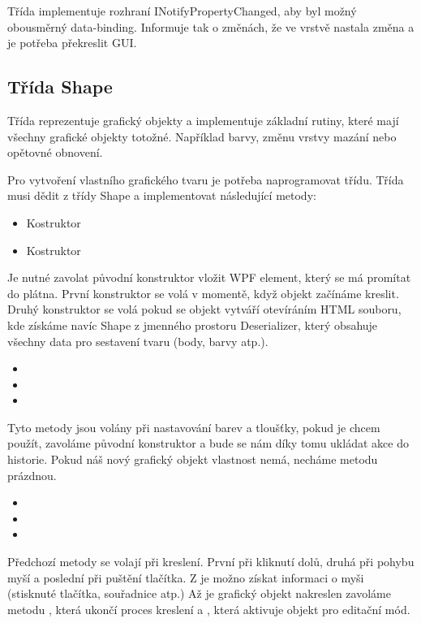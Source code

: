 \documentclass[
  field=inf,
  biblatex,
  glossaries,
  index
]{kidiplom}
\begin{document}
Třída implementuje rozhraní INotifyPropertyChanged, aby byl možný obousměrný data-binding. Informuje tak o změnách, že ve vrstvě nastala změna a je potřeba překreslit GUI.

\subsection{Třída Shape}

Třída reprezentuje grafický objekty a implementuje základní rutiny, které mají všechny grafické objekty totožné. Například barvy, změnu vrstvy mazání nebo opětovné obnovení.

Pro vytvoření vlastního grafického tvaru je potřeba naprogramovat třídu. Třída musi dědit z třídy Shape a implementovat následující metody:

\begin{itemize}
\item Kostruktor 
\item Kostruktor 
\end{itemize}
Je nutné zavolat původní konstruktor vložit WPF element, který se má promítat do plátna. První konstruktor se volá v momentě, když objekt začínáme kreslit. Druhý konstruktor se volá pokud se objekt vytváří otevíráním HTML souboru, kde získáme navíc Shape z jmenného prostoru Deserializer, který obsahuje všechny data pro sestavení tvaru (body, barvy atp.).

\begin{itemize}
\item {}
\item {}
\item {}
\end{itemize}
Tyto metody jsou volány při nastavování barev a tloušťky, pokud je chcem použít, zavoláme původní konstruktor  a bude se nám díky tomu ukládat akce do historie. Pokud náš nový grafický objekt vlastnost nemá, necháme metodu prázdnou.

\begin{itemize}
\item {}
\item {}
\item {}
\end{itemize}
Předchozí metody se volají při kreslení. První při kliknutí dolů, druhá při pohybu myší a poslední při puštění tlačítka. Z  je možno získat informaci o myši (stisknuté tlačítka, souřadnice atp.) Až je grafický objekt nakreslen zavoláme metodu , která ukončí proces kreslení a , která aktivuje objekt pro editační mód.
\end{document}
